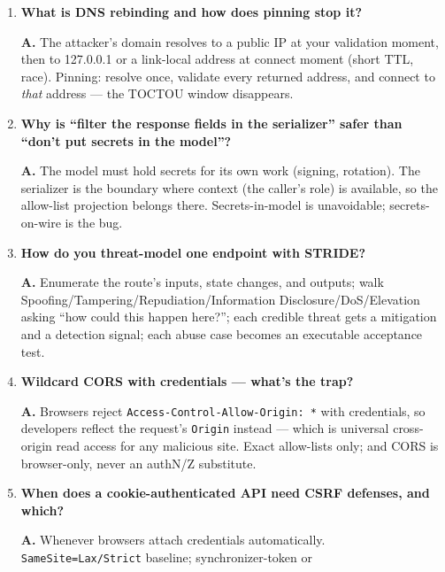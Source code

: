 \begin{enumerate}[label=\textbf{Q\arabic*.}, leftmargin=1.7cm, itemsep=0.9em, start=11]
        \textbf{A.} Scheme allow-list; exact host allow-list (no suffix
        matches, no raw IPs, no userinfo); port restriction; resolve-then-
        validate DNS against private/link-local ranges and connect to the
        validated address (anti-rebinding); re-validate every redirect hop;
        size/type caps; platform egress rules as the backstop.
  \item \textbf{What is DNS rebinding and how does pinning stop it?}\par
        \textbf{A.} The attacker's domain resolves to a public IP at your
        validation moment, then to 127.0.0.1 or a link-local address at
        connect moment (short TTL, race). Pinning: resolve once, validate
        every returned address, and connect to \emph{that} address ---
        the TOCTOU window disappears.
  \item \textbf{Why is ``filter the response fields in the serializer''
        safer than ``don't put secrets in the model''?}\par
        \textbf{A.} The model must hold secrets for its own work
        (signing, rotation). The serializer is the boundary where context
        (the caller's role) is available, so the allow-list projection
        belongs there. Secrets-in-model is unavoidable; secrets-on-wire is
        the bug.
  \item \textbf{How do you threat-model one endpoint with STRIDE?}\par
        \textbf{A.} Enumerate the route's inputs, state changes, and
        outputs; walk Spoofing/Tampering/Repudiation/Information
        Disclosure/DoS/Elevation asking ``how could this happen here?'';
        each credible threat gets a mitigation and a detection signal; each
        abuse case becomes an executable acceptance test.
  \item \textbf{Wildcard CORS with credentials --- what's the trap?}\par
        \textbf{A.} Browsers reject \texttt{Access-Control-Allow-Origin: *}
        with credentials, so developers reflect the request's
        \texttt{Origin} instead --- which is universal cross-origin read
        access for any malicious site. Exact allow-lists only; and CORS is
        browser-only, never an authN/Z substitute.
  \item \textbf{When does a cookie-authenticated API need CSRF defenses,
        and which?}\par
        \textbf{A.} Whenever browsers attach credentials automatically.
        \texttt{SameSite=Lax/Strict} baseline; synchronizer-token or

\end{enumerate}
